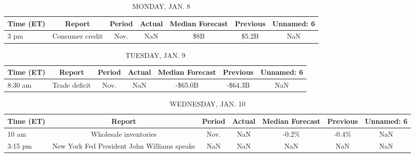 \documentclass{article}%
\begin{document}
%
\normalsize%


\begin{table}[htbp]%
\caption{MONDAY, JAN. 8}%
\centering%
\begin{adjustbox}{width=1\textwidth}%
\begin{tabular}{lcccccc}
\toprule
Time (ET) &          Report & Period & Actual & Median Forecast & Previous & Unnamed: 6 \\
\midrule
     3 pm & Consumer credit &   Nov. &    NaN &             \$8B &    \$5.2B &        NaN \\
\bottomrule
\end{tabular}
%
\end{adjustbox}%
\end{table}

%


\begin{table}[htbp]%
\caption{TUESDAY, JAN. 9}%
\centering%
\begin{adjustbox}{width=1\textwidth}%
\begin{tabular}{lcccccc}
\toprule
Time (ET) &        Report & Period & Actual & Median Forecast & Previous & Unnamed: 6 \\
\midrule
  8:30 am & Trade deficit &   Nov. &    NaN &         -\$65.0B &  -\$64.3B &        NaN \\
\bottomrule
\end{tabular}
%
\end{adjustbox}%
\end{table}

%


\begin{table}[htbp]%
\caption{WEDNESDAY, JAN. 10}%
\centering%
\begin{adjustbox}{width=1\textwidth}%
\begin{tabular}{lcccccc}
\toprule
Time (ET) &                                      Report & Period & Actual & Median Forecast & Previous & Unnamed: 6 \\
\midrule
    10 am &                       Wholesale inventories &   Nov. &    NaN &           -0.2\% &    -0.4\% &        NaN \\
  3:15 pm & New York Fed President John Williams speaks &    NaN &    NaN &             NaN &      NaN &        NaN \\
\bottomrule
\end{tabular}
%
\end{adjustbox}%
\end{table}

%
\end{document}
